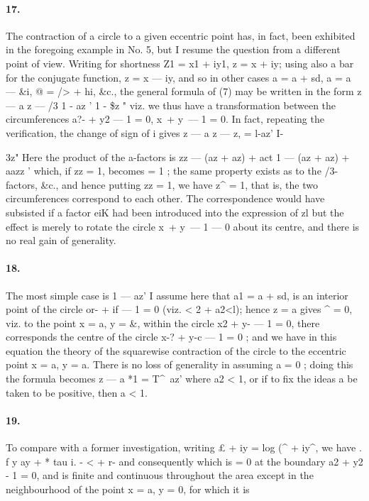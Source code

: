 \documentclass[11pt,a4paper]{book}
\begin{document}
{{{{{{\paragraph{17.} The  contraction  of  a  circle  to  a  given  eccentric  point  has,  in  fact,  been
exhibited  in  the  foregoing  example  in  No.  5,  but  I  resume  the  question  from  a  different
point  of  view.  Writing  for  shortness  Z1  =  x1  +  iy1,  z  =  x  +  iy;  using  also  a  bar  for
the  conjugate  function,  z  =  x  ---  iy,  and  so  in  other  cases  a  =  a  +  sd,  a  =  a  ---  \&i,
@  =  />  +  hi,  \&c.,  the  general  formula  of  (7)  may  be  written  in  the  form
z  ---  a      z  ---  /3
1  -  az  '  1  -  \$z  "
viz.     we     thus     have     a     transformation     between     the     circumferences     a?-  +  y2  ---  1  =  0,
x\  +  y\  ---  1  =  0.     In   fact,    repeating   the   verification,   the    change   of  sign   of  i   gives
z  ---  a      z  ---
z,  = 
l-az'  I-{3z"
Here  the  product  of  the  a-factors  is
zz  ---  (az  +  az)  +  act
1  ---  (az  +  az)  +  aazz '
which,  if  zz  =  1,  becomes  =  1  ;  the  same  property  exists  as  to  the  /3-factors,  \&c.,
and  hence  putting  zz  =  1,  we  have  z^  =  1,  that  is,  the  two  circumferences  correspond
to  each  other.  The  correspondence  would  have  subsisted  if  a  factor  eiK  had  been
introduced  into  the  expression  of  zl  but  the  effect  is  merely  to  rotate  the  circle
x\  +  y\  ---  1  ---  0  about  its  centre,  and  there  is  no  real  gain  of  generality.   
\paragraph{18.} The  most  simple  case  is
1  ---  az'
I  assume  here  that  a1  =  a  +  sd,  is  an  interior  point  of  the  circle  or-  +  if  ---  1  =  0
(viz.  < 2  +  a2<l);  hence  z  =  a  gives  ^  =  0,  viz.  to  the  point  x  =  a,  y  =  \&,  within  the
circle  x2  +  y-  ---  1  =  0,  there  corresponds  the  centre  of  the  circle  x-?  +  y-c  ---  1  =  0  ;  and
we  have  in  this  equation  the  theory  of  the  squarewise  contraction  of  the  circle  to
the  eccentric  point  x  =  a,  y  =  a.  There  is  no  loss  of  generality  in  assuming  a  =  0 ;
doing  this  the  formula  becomes
z  ---  a
*1  =  T^~az'
where  a2  <  1,  or  if  to  fix  the  ideas  a  be  taken  to  be  positive,  then  a  <  1.
\paragraph{19.} To  compare  with  a  former  investigation,  writing  £  +  iy  =  log  (^  +  iy^,  we  have
.  f    y  ay
+ * tau  i. - <  + r-
and  consequently
which    is    =  0    at    the    boundary   a2  +  y2  -  1  =  0,    and    is    finite    and    continuous  throughout
the    area    except    in    the    neighbourhood    of    the    point    x  =  a,    y  =  0,    for    which    it    is


}}}}}}}
\end{document}

